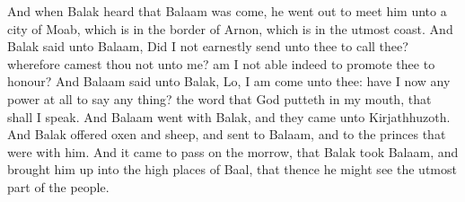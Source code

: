 \begin{biblechapter}
\verse And when Balak heard that Balaam was come, he went out to meet him unto a city of Moab, which is in the border of Arnon, which is in the utmost coast.
\verse And Balak said unto Balaam, Did I not earnestly send unto thee to call thee? wherefore camest thou not unto me? am I not able indeed to promote thee to honour?
\verse And Balaam said unto Balak, Lo, I am come unto thee: have I now any power at all to say any thing? the word that God putteth in my mouth, that shall I speak.
\verse And Balaam went with Balak, and they came unto Kirjathhuzoth.
\verse And Balak offered oxen and sheep, and sent to Balaam, and to the princes that were with him.
\verse And it came to pass on the morrow, that Balak took Balaam, and brought him up into the high places of Baal, that thence he might see the utmost part of the people.
\end{biblechapter}

